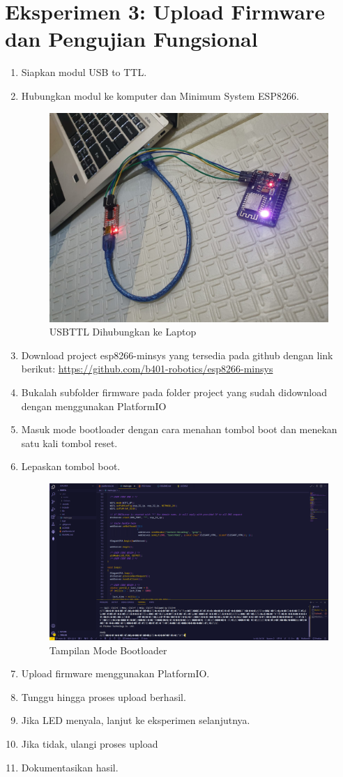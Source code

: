 \section{Eksperimen 3: Upload Firmware dan Pengujian Fungsional}
\begin{enumerate}
    \item Siapkan modul USB to TTL.
    \item Hubungkan modul ke komputer dan Minimum System ESP8266.
    \begin{figure}[H]
        \centering
        \includegraphics[width=0.4\linewidth]{P4/img/10_hubungkan_dengan_usbttl_dan_laptop.jpeg}
        \caption{USBTTL Dihubungkan ke Laptop}
        \label{fig:USBTTLLaptop}
    \end{figure}
    \item Download project esp8266-minsys yang tersedia pada github dengan link berikut: \url{https://github.com/b401-robotics/esp8266-minsys}
    \item Bukalah subfolder firmware pada folder project yang sudah didownload dengan menggunakan PlatformIO
    \item Masuk mode bootloader dengan cara menahan tombol boot dan menekan satu kali tombol reset.
    \item Lepaskan tombol boot.
    \begin{figure}[H]
        \centering
        \includegraphics[width=0.4\linewidth]{P4/img/10_tampilan_ketika_esp_masuk_bootloader.png}
        \caption{Tampilan Mode Bootloader}
        \label{fig:TampilanModeBoot}
    \end{figure}
    \item Upload firmware menggunakan PlatformIO.
    \item Tunggu hingga proses upload berhasil.
    \item Jika LED menyala, lanjut ke eksperimen selanjutnya.
    \item Jika tidak, ulangi proses upload
    \item Dokumentasikan hasil.
\end{enumerate}

